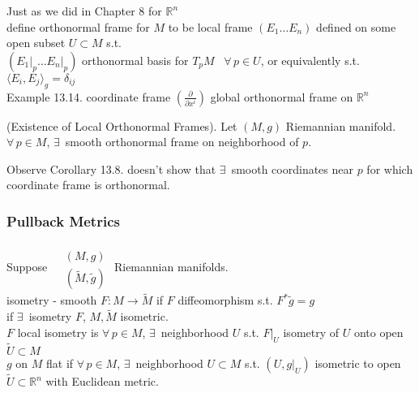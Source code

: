 Just as we did in Chapter 8 for $\mathbb{R}^n$ \\ %
\quad define orthonormal frame for $M$ to be local frame $(E_1 \dots E_n)$ defined on some open subset $U \subset M$ s.t. \\
\quad \quad $( \left. E_1 \right|_p \dots \left. E_n \right|_p )$ orthonormal basis for $T_pM$ \quad \, $\forall \, p \in U$, or equivalently s.t. $\langle E_i, E_j \rangle_g = \delta_{ij}$ \\

Example 13.14.  coordinate frame $\left( \frac{ \partial }{ \partial x^i} \right)$ global orthonormal frame on $\mathbb{R}^n$

\begin{corollary}[13.8] (Existence of Local Orthonormal Frames).  Let $(M,g)$ Riemannian manifold. \\
$\forall \, p \in M$, $\exists \, $ smooth orthonormal frame on neighborhood of $p$.
\end{corollary}



Observe Corollary 13.8.  doesn't show that $\exists \, $ smooth coordinates near $p$ for which coordinate frame is orthonormal. \\

\subsubsection*{Pullback Metrics}

Suppose $\begin{aligned} & \quad \\ 
  & (M,g) \\
  & (\widetilde{M}, \widetilde{g}) \end{aligned}$ \quad Riemannian manifolds.  \\

isometry - smooth $F: M \to \widetilde{M}$ if $F$ diffeomorphism s.t. $F^* \widetilde{g} = g$ \\
if $\exists \, $ isometry $F$, $M, \widetilde{M}$ isometric. \\
$F$ local isometry is $\forall \, p \in M$, $\exists \, $ neighborhood $U$ s.t. $\left. F \right|_U$ isometry of $U$ onto open $\widetilde{U} \subset M$ \\
$g$ on $M$ flat if $\forall \, p \in M$, $\exists \,$ neighborhood $U\subset M$ s.t. $(U , \left. g \right|_U)$ isometric to open $\widetilde{U} \subset \mathbb{R}^n$ with Euclidean metric.   \\


